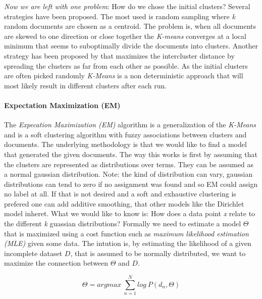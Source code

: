     \emph{Now we are left with one problem}: How do we chose the initial clusters? Several strategies have been proposed. The most used is random sampling where \emph{k} random documents are chosen as a centroid. The problem is, when all documents are skewed to one direction or close together the \emph{K-means} converges at a local minimum that seems to suboptimally divide the documents into clusters.
    Another strategy has been proposed by \cite{KMeansPlusPlus2007} that maximizes the intercluster distance by spreading the clusters as far from each other as possible. 
    As the initial clusters are often picked randomly \emph{K-Means} is a non deterministic approach that will most likely result in different clusters after each run.

    \paragraph{Expectation Maximization (EM)}
    The \emph{Expecation Maximization (EM)} algorithm is a generalization of the \emph{K-Means} and is a soft clustering algorithm with fuzzy associations between clusters and documents. The underlying methodology is that we would like to find a model that generated the given documents. The way this works is first by assuming that the clusters are represented as distributions over terms. They can be assumed as a normal gaussian distribution. Note: the kind of distribution can vary, gaussian distributions can tend to zero if no assignment was found and so EM could assign no label at all. If that is not desired and a soft and exhaustive clustering is prefered one can add additive smoothing, that other models like the Dirichlet model inheret. What we would like to know is: How does a data point \emph{x} relate to the different \emph{k} guassian distributions? Formally we need to estimate a model $\Theta$ that is maximized using a cost function such as \emph{maximum likelihood estimation (MLE)} given some data. The intution is, by estimating the likelihood of a given incomplete dataset $D$, that is assumed to be normally distributed, we want to maximize the connection between $\Theta$ and $D$.

      \begin{equation}
        \Theta = argmax\:\sum_{n=1}^{N}log\:P(d_n,\Theta)
      \end{equation}

